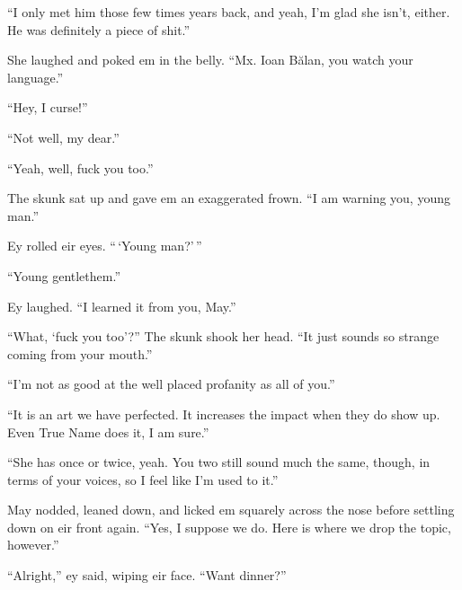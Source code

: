 ``I only met him those few times years back, and yeah, I'm glad she isn't, either. He was definitely a piece of shit.''

She laughed and poked em in the belly. ``Mx. Ioan Bălan, you watch your language.''

``Hey, I curse!''

``Not well, my dear.''

``Yeah, well, fuck you too.''

The skunk sat up and gave em an exaggerated frown. ``I am warning you, young man.''

Ey rolled eir eyes. ``\,`Young man?'\,''

``Young gentlethem.''

Ey laughed. ``I learned it from you, May.''

``What, `fuck you too'?'' The skunk shook her head. ``It just sounds so strange coming from your mouth.''

``I'm not as good at the well placed profanity as all of you.''

``It is an art we have perfected. It increases the impact when they do show up. Even True Name does it, I am sure.''

``She has once or twice, yeah. You two still sound much the same, though, in terms of your voices, so I feel like I'm used to it.''

May nodded, leaned down, and licked em squarely across the nose before settling down on eir front again. ``Yes, I suppose we do. Here is where we drop the topic, however.''

``Alright,'' ey said, wiping eir face. ``Want dinner?''
